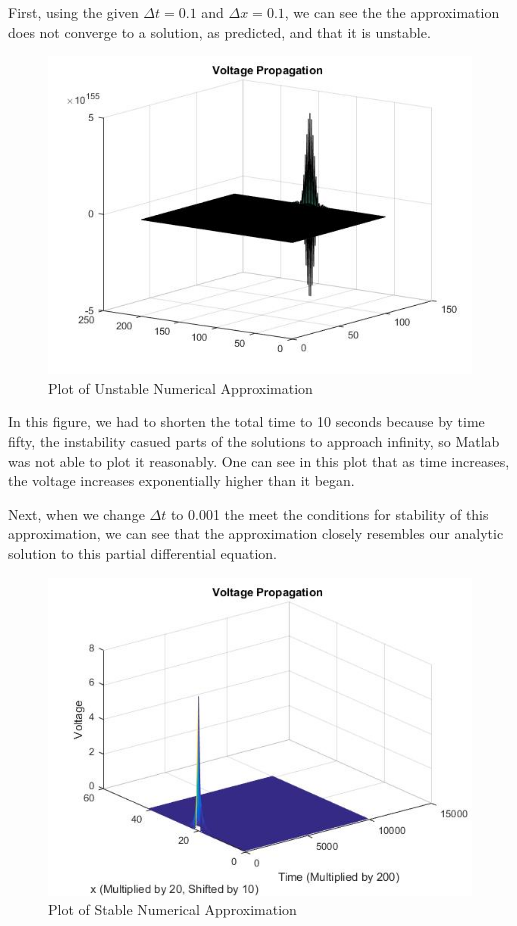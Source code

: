 \documentclass[12pt]{article}
\begin{document}
First, using the given $\Delta{t}=0.1$ and $\Delta{x}=0.1$, we can see the the approximation does not converge to a solution, as predicted, and that it is unstable. 
\begin{figure}[H]
  \includegraphics[width=\linewidth]{plot1.jpg}
  \caption{Plot of Unstable Numerical Approximation}
  \label{fig:sketch1}
\end{figure}
In this figure, we had to shorten the total time to 10 seconds because by time fifty, the instability casued parts of the solutions to approach infinity, so Matlab was not able to plot it reasonably. One can see in this plot that as time increases, the voltage increases exponentially higher than it began. \par
Next, when we change $\Delta{t}$ to 0.001 the meet the conditions for stability of this approximation, we can see that the approximation closely resembles our analytic solution to this partial differential equation.
\begin{figure}[H]
  \includegraphics[width=\linewidth]{Plot2.jpg}
  \caption{Plot of Stable Numerical Approximation}
  \label{fig:sketch2}
\end{figure}
\end{document}
